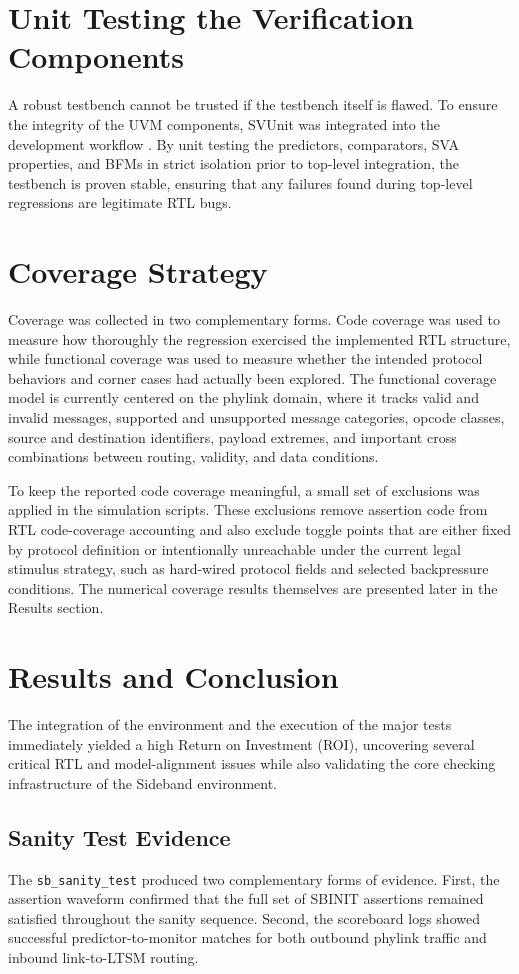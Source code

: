 \section{Unit Testing the Verification Components}
A robust testbench cannot be trusted if the testbench itself is flawed. To ensure the integrity of the UVM components, SVUnit was integrated into the development workflow \cite{svunit_paper}. By unit testing the predictors, comparators, SVA properties, and BFMs in strict isolation prior to top-level integration, the testbench is proven stable, ensuring that any failures found during top-level regressions are legitimate RTL bugs.

\section{Coverage Strategy}
Coverage was collected in two complementary forms. Code coverage was used to measure how thoroughly the regression exercised the implemented RTL structure, while functional coverage was used to measure whether the intended protocol behaviors and corner cases had actually been explored. The functional coverage model is currently centered on the phylink domain, where it tracks valid and invalid messages, supported and unsupported message categories, opcode classes, source and destination identifiers, payload extremes, and important cross combinations between routing, validity, and data conditions.

To keep the reported code coverage meaningful, a small set of exclusions was applied in the simulation scripts. These exclusions remove assertion code from RTL code-coverage accounting and also exclude toggle points that are either fixed by protocol definition or intentionally unreachable under the current legal stimulus strategy, such as hard-wired protocol fields and selected backpressure conditions. The numerical coverage results themselves are presented later in the Results section.

\section{Results and Conclusion}
The integration of the environment and the execution of the major tests immediately yielded a high Return on Investment (ROI), uncovering several critical RTL and model-alignment issues while also validating the core checking infrastructure of the Sideband environment.

\subsection{Sanity Test Evidence}
The \texttt{sb\_sanity\_test} produced two complementary forms of evidence. First, the assertion waveform confirmed that the full set of SBINIT assertions remained satisfied throughout the sanity sequence. Second, the scoreboard logs showed successful predictor-to-monitor matches for both outbound phylink traffic and inbound link-to-LTSM routing.

